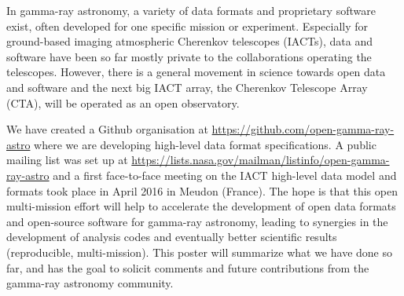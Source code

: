 In gamma-ray astronomy, a variety of data formats and proprietary software
exist, often developed for one specific mission or experiment. Especially for
ground-based imaging atmospheric Cherenkov telescopes (IACTs), data and software
have been so far mostly private to the collaborations operating the telescopes.
However, there is a general movement in science towards open data and software
and the next big IACT array, the Cherenkov Telescope Array (CTA), will be
operated as an open observatory.

We have created a Github organisation at \url{https://github.com/open-gamma-ray-astro}
where we are developing high-level data format specifications. A public mailing
list was set up at \url{https://lists.nasa.gov/mailman/listinfo/open-gamma-ray-astro}
and a first face-to-face meeting on the IACT high-level data model and formats
took place in April 2016 in Meudon (France). The hope is that this open
multi-mission effort will help to accelerate the development of open data
formats and open-source software for gamma-ray astronomy, leading to synergies
in the development of analysis codes and eventually better scientific results
(reproducible, multi-mission). This poster will summarize what we have done so
far, and has the goal to solicit comments and future contributions from the
gamma-ray astronomy community.
